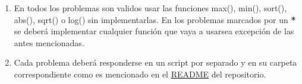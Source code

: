 \begin{enumerate}
    \item En todos los problemas son validos usar las funciones max(), min(), sort(), abs(), sqrt() o log() sin implementarlas. En los problemas marcados por un \textbf{*} se deberá implementar cualquier función que vaya a usarsea excepción de las antes mencionadas.
    \item Cada problema deberá responderse en un script por separado y en su carpeta correspondiente como es mencionado en el \href{https://github.com/giovannilopez9808/Ejercicios_Chuy/blob/main/README.md}{README} del repositorio.
\end{enumerate}